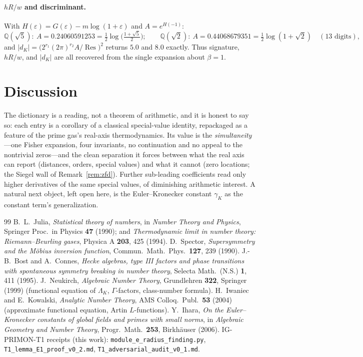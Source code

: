 \documentclass[a4paper,11pt]{article}
\theoremstyle{plain}
\theoremstyle{definition}
\theoremstyle{remark}
\newcommand{\eps}{\varepsilon}
\newcommand{\Q}{\mathbb{Q}}
\newcommand{\Res}{\operatorname{Res}}
\begin{document}
\paragraph{$hR/w$ and discriminant.} With $H(\eps)=G(\eps)-m\log(1+\eps)$ and $A=e^{H(-1)}$:
\[
\Q(\sqrt5):\ A=0.24060591253=\tfrac12\log\!\big(\tfrac{1+\sqrt5}{2}\big);\qquad
\Q(\sqrt2):\ A=0.44068679351=\tfrac12\log(1+\sqrt2)\quad(\text{13 digits}),
\]
and $|d_K|=\big(2^{r_1}(2\pi)^{r_2}A/\Res\big)^2$ returns $5.0$ and $8.0$ exactly. Thus signature, $hR/w$,
and $|d_K|$ are all recovered from the single expansion about $\beta=1$.

\section{Discussion}\label{sec:discussion}
The dictionary is a reading, not a theorem of arithmetic, and it is honest to say so: each entry is a
corollary of a classical special-value identity, repackaged as a feature of the prime gas's real-axis
thermodynamics. Its value is the \emph{simultaneity}---one Fisher expansion, four invariants, no continuation
and no appeal to the nontrivial zeros---and the clean separation it forces between what the real axis can
report (distances, orders, special values) and what it cannot (zero locations; the Siegel wall of
Remark~\ref{rem:zfd}). Further sub-leading coefficients read only higher derivatives of the same special
values, of diminishing arithmetic interest. A natural next object, left open here, is the Euler--Kronecker
constant $\gamma_K$ \cite{ihara} as the constant term's generalization.

\begin{thebibliography}{99}
 B.~L.~Julia, \emph{Statistical theory of numbers}, in \emph{Number Theory and Physics},
  Springer Proc.\ in Physics \textbf{47} (1990); and \emph{Thermodynamic limit in number theory:
  Riemann--Beurling gases}, Physica A \textbf{203}, 425 (1994).
 D.~Spector, \emph{Supersymmetry and the M\"obius inversion function},
  Commun.\ Math.\ Phys.\ \textbf{127}, 239 (1990). J.-B.~Bost and A.~Connes, \emph{Hecke algebras, type III factors and phase transitions
  with spontaneous symmetry breaking in number theory}, Selecta Math.\ (N.S.) \textbf{1}, 411 (1995). J.~Neukirch, \emph{Algebraic Number Theory}, Grundlehren \textbf{322}, Springer (1999)
  (functional equation of $\Lambda_K$, $\Gamma$-factors, class-number formula). H.~Iwaniec and E.~Kowalski, \emph{Analytic Number Theory}, AMS Colloq.\ Publ.\
  \textbf{53} (2004) (approximate functional equation, Artin $L$-functions). Y.~Ihara, \emph{On the Euler--Kronecker constants of global fields and primes with small
  norms}, in \emph{Algebraic Geometry and Number Theory}, Progr.\ Math.\ \textbf{253}, Birkh\"auser (2006).\bibitem{repo} IG-PRIMON-T1 receipts (this work): \texttt{module\_e\_radius\_finding.py},
  \texttt{T1\_lemma\_E1\_proof\_v0\_2.md}, \texttt{T1\_adversarial\_audit\_v0\_1.md}.
\end{thebibliography}
\end{document}
